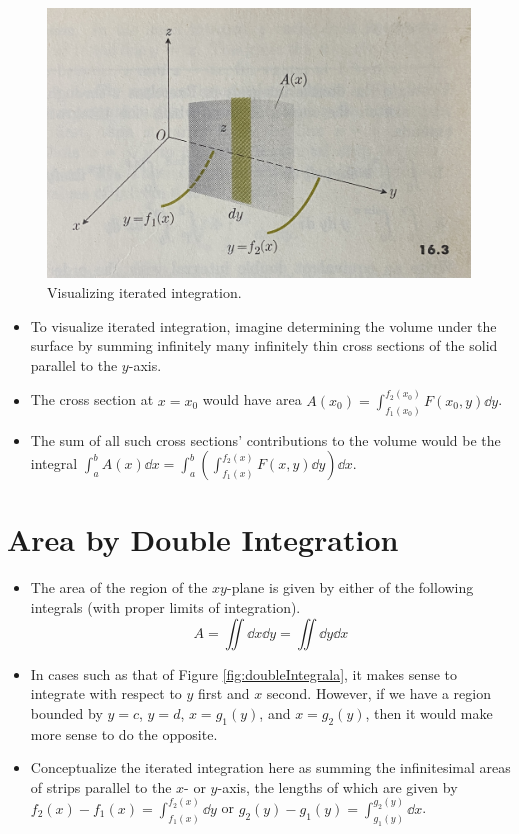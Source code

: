 \documentclass[../main.tex]{subfiles}
\begin{document}
\begin{itemize}
\begin{figure}[h!]
        \centering
        \includegraphics[width=0.4\linewidth]{ExtFiles/interatedIntegration.jpg}
        \caption{Visualizing iterated integration.}
        \label{fig:iteratedIntegration}
    \end{figure}
    \begin{itemize}
        \item To visualize iterated integration, imagine determining the volume under the surface by summing infinitely many infinitely thin cross sections of the solid parallel to the $y$-axis.
        \item The cross section at $x=x_0$ would have area $A(x_0)=\int_{f_1(x_0)}^{f_2(x_0)} F(x_0,y)\dd{y}$.
        \item The sum of all such cross sections' contributions to the volume would be the integral $\int_a^bA(x)\dd{x}=\int_a^b\left( \int_{f_1(x)}^{f_2(x)} F(x,y)\dd{y} \right)\dd{x}$.
    \end{itemize}
\end{itemize}



\section{Area by Double Integration}
\begin{itemize}
    \item The area of the region of the $xy$-plane is given by either of the following integrals (with proper limits of integration).
    \begin{equation*}
        A = \iint\dd{x}\dd{y} = \iint\dd{y}\dd{x}
    \end{equation*}
    \item In cases such as that of Figure \ref{fig:doubleIntegrala}, it makes sense to integrate with respect to $y$ first and $x$ second. However, if we have a region bounded by $y=c$, $y=d$, $x=g_1(y)$, and $x=g_2(y)$, then it would make more sense to do the opposite.
    \item Conceptualize the iterated integration here as summing the infinitesimal areas of strips parallel to the $x$- or $y$-axis, the lengths of which are given by $f_2(x)-f_1(x)=\int_{f_1(x)}^{f_2(x)}\dd{y}$ or $g_2(y)-g_1(y)=\int_{g_1(y)}^{g_2(y)}\dd{x}$.
\end{itemize}
\end{document}
